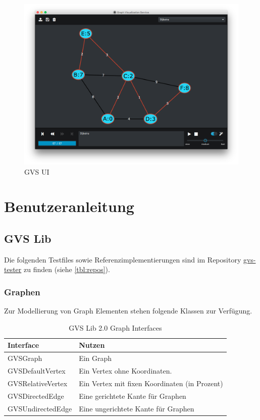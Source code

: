 \documentclass[11pt,a4paper,english,oneside]{book}
\numberwithin{equation}{chapter}
\begin{document}
	\begin{figure}[h!]
		\centering
		\includegraphics[width=0.7\linewidth]{assets/images/gvs-ui}
		\caption{GVS UI}
		\label{fig:gvs-ui}
	\end{figure}

	\clearpage
	


	
	
	\chapter{Benutzeranleitung}
	\section{GVS Lib}
	Die folgenden Testfiles sowie Referenzimplementierungen sind im Repository \href{https://github.com/Graphs-Visualization-Service/gvs-tester}{gvs-tester} zu finden (siehe \ref{tbl:repos}).
	
	
	\subsection{Graphen}
	Zur Modellierung von Graph Elementen stehen folgende Klassen zur Verfügung.

	\begin{table}[h!]
		\centering
		\begin{tabularx}{\linewidth}{l l}
			\toprule 
			Interface & Nutzen \\
			\midrule
			GVSGraph & Ein Graph \\
			GVSDefaultVertex & Ein Vertex ohne Koordinaten. \\
			GVSRelativeVertex & Ein Vertex mit fixen Koordinaten (in Prozent) \\
			GVSDirectedEdge & Eine gerichtete Kante für Graphen \\
			GVSUndirectedEdge & Eine ungerichtete Kante für Graphen \\
			\bottomrule 
		\end{tabularx} 
		\caption{GVS Lib 2.0 Graph Interfaces} 
		\label{tbl:Interfaces}
	\end{table}
	
\end{document}
